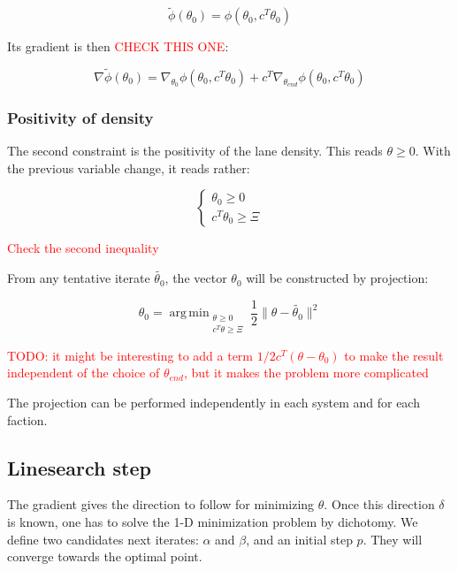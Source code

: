 \documentclass[11pt,a4paper]{article}		%
\DeclareMathOperator*{\argmin}{arg\, min}
\begin{document}
\begin{equation}
\tilde{\phi}(\theta_0) = \phi(\theta_0,c^T\theta_0)
\end{equation}

Its gradient is then \textcolor{red}{CHECK THIS ONE}:

\begin{equation}
\nabla\tilde{\phi}(\theta_0) = \nabla_{\theta_0}\phi(\theta_0,c^T\theta_0) + c^T\nabla_{\theta_{end}}\phi(\theta_0,c^T\theta_0)
\end{equation}

\subsubsection{Positivity of density} \label{sect:pos}

The second constraint is the positivity of the lane density. This reads $\theta\geqslant0$. With the previous variable change, it reads rather:

\begin{equation}
\begin{cases}
	\theta_0 \geqslant 0\\
	c^T\theta_0 \geqslant \Xi
\end{cases}
\end{equation}

\textcolor{red}{Check the second inequality}

From any tentative iterate $\tilde{\theta_0}$, the vector $\theta_0$ will be constructed by projection:

\begin{equation}
\theta_0 = \argmin_{\substack{\theta \geqslant 0\\c^T\theta \geqslant \Xi}} \dfrac{1}{2}\|\theta-\tilde{\theta_0}\|^2
\end{equation}

\textcolor{red}{TODO: it might be interesting to add a term $1/2 c^T(\theta-\theta_0)$ to make the result independent of the choice of $\theta_{end}$, but it makes the problem more complicated}

The projection can be performed independently in each system and for each faction.

\subsection{Linesearch step}

The gradient gives the direction to follow for minimizing $\theta$. Once this direction $\delta$ is known, one has to solve the 1-D minimization problem by dichotomy. We define two candidates next iterates: $\alpha$ and $\beta$, and an initial step $p$. They will converge towards the optimal point.
\end{document}
